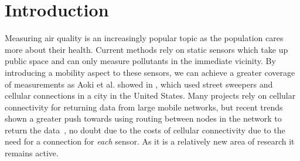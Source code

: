 \chapter{Introduction}\label{introduction}



    Measuring air quality is an increasingly popular topic as the population cares more about their health. Current methods rely on static sensors which take up public space and can only measure pollutants in the immediate vicinity. By introducing a mobility aspect to these sensors, we can achieve a greater coverage of measurements as Aoki et al. showed in \cite{vehicleforresearch}, which used street sweepers and cellular connections in a city in the United States. Many projects rely on cellular connectivity for returning data from large mobile networks, but recent trends shown a greater push towards using routing between nodes in the network to return the data~\cite{manetmessaging,cafnet,cartel,commonsense}, no doubt due to the costs of cellular connectivity due to the need for a connection for \emph{each} sensor. As it is a relatively new area of research it remains active. 

